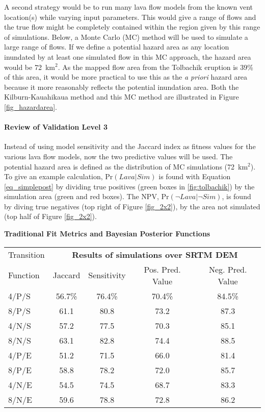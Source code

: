 	A second strategy would be to run many lava flow models from the known vent location(s) while varying input parameters. This would give a range of flows and the true flow might be completely contained within the region given by this range of simulations. Below, a Monte Carlo (MC) method will be used to simulate a large range of flows. If we define a potential hazard area as any location inundated by at least one simulated flow in this MC approach, the hazard area would be 72~km$^2$. As the mapped flow area from the Tolbachik eruption is 39\% of this area, it would be more practical to use this as the \textit{a priori} hazard area because it more reasonably reflects the potential inundation area. Both the Kilburn-Kauahikaua method and this MC method are illustrated in Figure \ref{fig_hazardarea}.				
	
	\paragraph{Review of Validation Level 3} Instead of using model sensitivity and the Jaccard index as fitness values for the various lava flow models, now the two predictive values will be used. The potential hazard area is defined as the distribution of MC simulations (72~km$^2$). To give an example calculation, $\text{Pr}(Lava|Sim)$ is found with Equation \ref{eq_simplepost} by dividing true positives (green boxes in \ref{fig:tolbachik}) by the simulation area (green and red boxes). The NPV, $\text{Pr}(\neg Lava|\neg Sim)$, is found by diving true negatives (top right of Figure \ref{fig_2x2}), by the area not simulated (top half of Figure \ref{fig_2x2}).
	
		\begin{center}
		\textbf{Traditional Fit Metrics and Bayesian Posterior Functions}\\
		\begin{tabular}{l c c c c}
			\toprule
			Transition&\multicolumn{4}{c}{\textbf{Results of simulations over SRTM DEM}}\\
			Function& Jaccard & Sensitivity & Pos. Pred. Value & Neg. Pred. Value\\
			\midrule
			4/P/S & 56.7\%& 76.4\%& 70.4\%& 84.5\% \\
			8/P/S & 61.1  & 80.8  & 73.2  & 87.3   \\
			4/N/S & 57.2  & 77.5  & 70.3  & 85.1   \\
			8/N/S & 63.1  & 82.8  & 74.4  & 88.5   \\
			4/P/E & 51.2  & 71.5  & 66.0  & 81.4   \\
			8/P/E & 58.8  & 78.2  & 72.0  & 85.7   \\
			4/N/E & 54.5  & 74.5  & 68.7  & 83.3   \\
			8/N/E & 59.6  & 78.8  & 72.8  & 86.2   \\
			
			\bottomrule
		\end{tabular}
	\end{center}
	
